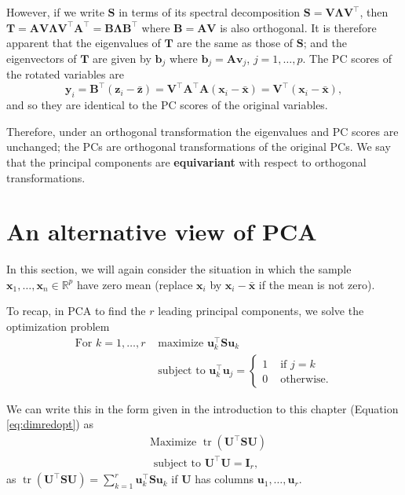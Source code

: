 \documentclass[
]{book}
\theoremstyle{definition}
\theoremstyle{definition}
\theoremstyle{definition}
\theoremstyle{definition}
\theoremstyle{remark}
\begin{document}
However, if we write \(\mathbf S\) in terms of its spectral decomposition \(\mathbf S= \mathbf V\boldsymbol \Lambda\mathbf V^\top\), then \(\mathbf T= \mathbf A\mathbf V\boldsymbol \Lambda\mathbf V^\top \mathbf A^\top = \mathbf B\boldsymbol \Lambda\mathbf B^\top\) where \(\mathbf B= \mathbf A\mathbf V\) is also orthogonal. It is therefore apparent that the eigenvalues of \(\mathbf T\) are the same as those of \(\mathbf S\); and the eigenvectors of \(\mathbf T\) are given by \(\mathbf b_j\) where \(\mathbf b_j = \mathbf A\mathbf v_j\), \(j=1,\ldots,p\). The PC scores of the rotated variables are
\[ \mathbf y_i = \mathbf B^\top (\mathbf z_i - \bar{\mathbf z}) = \mathbf V^\top \mathbf A^\top \mathbf A(\mathbf x_i - \bar{\mathbf x}) = \mathbf V^\top (\mathbf x_i - \bar{\mathbf x}),\]
and so they are identical to the PC scores of the original variables.

Therefore, under an orthogonal transformation the eigenvalues and PC scores are unchanged; the PCs are orthogonal transformations of the original PCs. We say that the principal components are \textbf{equivariant} with respect to orthogonal transformations.

\hypertarget{an-alternative-view-of-pca}{%
\section{An alternative view of PCA}\label{an-alternative-view-of-pca}}

In this section, we will again consider the situation in which the sample \(\mathbf x_1, \ldots , \mathbf x_n \in \mathbb{R}^p\) have zero mean (replace \(\mathbf x_i\) by \(\mathbf x_i-\bar{\mathbf x}\) if the mean is not zero).

To recap, in PCA to find the \(r\) leading principal components, we solve the optimization problem
\begin{align*}
\mbox{For } k=1, \ldots, r &\mbox{ maximize } \mathbf u_k^\top \mathbf S\mathbf u_k \\
 &\mbox{ subject to } \mathbf u_k^\top \mathbf u_j = \begin{cases}
 1  &\mbox{ if } j=k\\
 0 & \mbox{ otherwise.}
 \end{cases}
 \end{align*}

We can write this in the form given in the introduction to this chapter (Equation \eqref{eq:dimredopt}) as
\begin{align*}
&\mbox{Maximize } \operatorname{tr}(\mathbf U^\top \mathbf S\mathbf U) \\
 &\mbox{ subject to } \mathbf U^\top \mathbf U=\mathbf I_r,
 \end{align*}
as \(\operatorname{tr}(\mathbf U^\top \mathbf S\mathbf U) = \sum_{k=1}^r \mathbf u_k^\top \mathbf S\mathbf u_k\) if \(\mathbf U\) has columns \(\mathbf u_1, \ldots, \mathbf u_r\).
\end{document}
